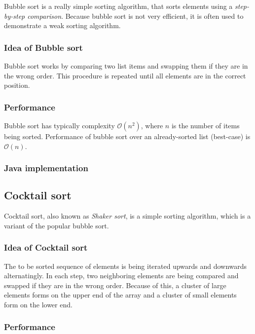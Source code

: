 \documentclass[nobranding]{pfBook}
\newcommand{\OO}{\mathcal{O}}
\begin{document}
	Bubble sort is a really simple sorting algorithm, that sorts elements using a \emph{step-by-step comparison}. Because bubble sort is not very efficient, it is often used to demonstrate a weak sorting algorithm.
	
	\subsubsection{Idea of Bubble sort}
	
	Bubble sort works by comparing two list items and swapping them if they are in the wrong order. This procedure is repeated until all elements are in the correct position.
	
	\subsubsection{Performance}
	
	Bubble sort has typically complexity $\OO(n^2)$, where $n$ is the number of items being sorted. Performance of bubble sort over an already-sorted list (best-case) is $\OO(n)$.
	
	\subsubsection{Java implementation}
	
	
	
	\subsection{Cocktail sort}
	
	Cocktail sort, also known as \emph{Shaker sort}, is a simple sorting algorithm, which is a variant of the popular bubble sort.
	
	\subsubsection{Idea of Cocktail sort}
	
	The to be sorted sequence of elements is being iterated upwards and downwards alternatingly. In each step, two neighboring elements are being compared and swapped if they are in the wrong order. Because of this, a cluster of large elements forms on the upper end of the array and a cluster of small elements form on the lower end.
	
	\subsubsection{Performance}
	
\end{document}
